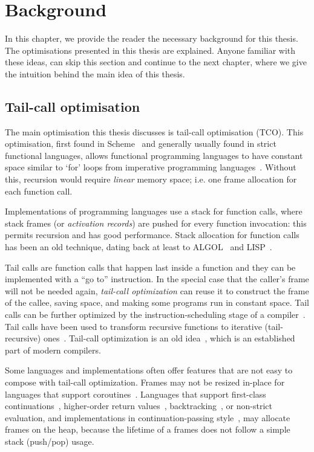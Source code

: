 \documentclass[diploma]{softlab-thesis}
\begin{document}
\chapter{Background}
\label{ch:background}

In this chapter, we provide the reader the necessary background for this thesis. The optimisations presented in this thesis 
are explained. Anyone familiar with these ideas, can skip this section and continue to the next chapter, where we give the intuition behind the
main idea of this thesis.

\section{Tail-call optimisation}
\label{sec:tco}

The main optimisation this thesis discusses is tail-call optimisation (TCO). This optimisation, first found 
in Scheme~\cite{Sussman:1975:IEL:889230,Steele:1976:LUI:889232} and
generally usually found in strict functional languages, 
allows functional programming languages to have constant space 
similar to `for' loops from imperative programming languages~\cite{Clinger:1998:PTR:277650.277719}. 
Without this, recursion would require \textit{linear} memory space; 
i.e. one frame allocation for each function call.

Implementations of programming languages use a stack for function calls, 
where stack frames (or \emph{activation records}) are pushed for every function invocation: this permits recursion 
and has good performance. Stack allocation for function calls has been an old technique, 
dating back at least to ALGOL~\cite{Dijkstra60,Naur78} and LISP~\cite{McCarthy60,Stoyan79}.

Tail calls are function calls that happen last inside a function and
they can be implemented with a ``go to'' instruction. In the special
case that the caller's frame will not be needed again, \emph{tail-call
  optimization} can reuse it to construct the frame of the callee,
saving space, and making some programs run in constant
space. Tail calls can be further optimized by the
instruction-scheduling stage of a compiler~\cite[\S12.4.3]{Torczon12}.
Tail calls have been used to transform recursive functions to
iterative (tail-recursive)
ones~\cite[\S{9}]{McCarthy62}\cite{Barron68}.  Tail-call optimization
is an old idea~\cite[p.~7]{Gill65}\cite[p.~21]{Knuth74}, which is an
established part of modern compilers.

Some languages and implementations often offer features that are not
easy to compose with tail-call optimization. Frames may
not be resized in-place for languages that support
coroutines~\cite[p.~60]{Waite84}. Languages that support first-class
continuations~\cite{Sperber10}, higher-order return
values~\cite[p.~103]{Appel92}\cite{Steele78},
backtracking~\cite{Bobrow73}, or non-strict evaluation, and
implementations in continuation-passing style~\cite[p.~103]{Appel92},
may allocate frames on the heap, because the lifetime of a frames does
not follow a simple stack (push/pop) usage.
\end{document}
